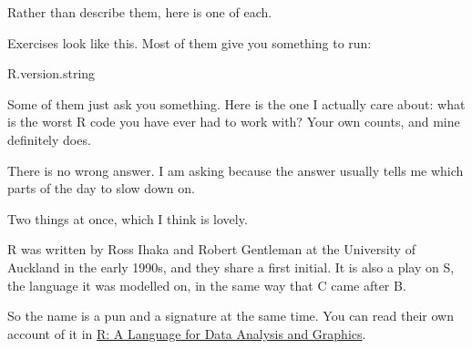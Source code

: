 \documentclass[
  letterpaper,
  justified,
  a4paper]{tufte-book}
\makeatletter
\newenvironment{Shaded}{\begin{snugshade}}{\end{snugshade}}
\newcommand{\NormalTok}[1]{\textcolor[rgb]{0.00,0.23,0.31}{#1}}
\let\rbporigShaded\Shaded
\let\rbporigendShaded\endShaded
\renewenvironment{Shaded}{%
  \begingroup
  \ifdim\linewidth=\rbpbodywidth
    \advance\linewidth by \@tufte@overhang
    \advance\hsize by \@tufte@overhang
    \advance\columnwidth by \@tufte@overhang
  \fi
  \rbporigShaded
}{%
  \rbporigendShaded
  \endgroup
}
\makeatother
\begin{document}
Rather than describe them, here is one of each.

\begin{tcolorbox}[enhanced jigsaw, arc=.35mm, bottomrule=.15mm, bottomtitle=1mm, breakable, colback=white, colbacktitle=quarto-callout-note-color!10!white, colframe=quarto-callout-note-color-frame, coltitle=black, left=2mm, leftrule=.75mm, opacityback=0, opacitybacktitle=0.6, rightrule=.15mm, title=\textcolor{quarto-callout-note-color}{\faInfo}\hspace{0.5em}{Your Turn}, titlerule=0mm, toprule=.15mm, toptitle=1mm]

Exercises look like this. Most of them give you something to run:

\begin{Shaded}
\begin{Highlighting}[]
\NormalTok{R.version.string}
\end{Highlighting}
\end{Shaded}

Some of them just ask you something. Here is the one I actually care
about: what is the worst R code you have ever had to work with? Your own
counts, and mine definitely does.

There is no wrong answer. I am asking because the answer usually tells
me which parts of the day to slow down on.

\end{tcolorbox}

\begin{tcolorbox}[enhanced jigsaw, arc=.35mm, bottomrule=.15mm, bottomtitle=1mm, breakable, colback=white, colbacktitle=quarto-callout-caution-color!10!white, colframe=quarto-callout-caution-color-frame, coltitle=black, left=2mm, leftrule=.75mm, opacityback=0, opacitybacktitle=0.6, rightrule=.15mm, title=\textcolor{quarto-callout-caution-color}{\faFire}\hspace{0.5em}{Some history: where the name R comes from}, titlerule=0mm, toprule=.15mm, toptitle=1mm]

Two things at once, which I think is lovely.

R was written by Ross Ihaka and Robert Gentleman at the University of
Auckland in the early 1990s, and they share a first initial. It is also
a play on S, the language it was modelled on, in the same way that C
came after B.

So the name is a pun and a signature at the same time. You can read
their own account of it in
\href{https://www.stat.auckland.ac.nz/~ihaka/downloads/R-paper.pdf}{R: A
Language for Data Analysis and Graphics}.

\end{tcolorbox}
\end{document}
